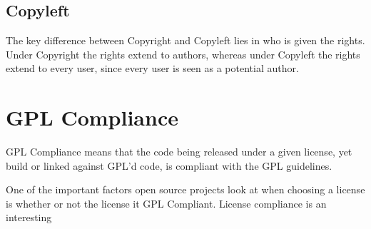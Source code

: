 \documentclass[12pt,letterpaper]{article}
\begin{document}
\subsection*{Copyleft}
The key difference between Copyright and Copyleft lies in who is given
the rights. Under Copyright the rights extend to authors, whereas under
Copyleft the rights extend to every user, since every user is seen as a
potential author.


\section*{GPL Compliance}
GPL Compliance means that the code being released under a given license, yet build or linked against GPL'd code, is compliant with the GPL guidelines.

One of the important factors open source projects look at when choosing a license is whether or not the license it GPL Compliant. License compliance is an interesting 


\end{document}
